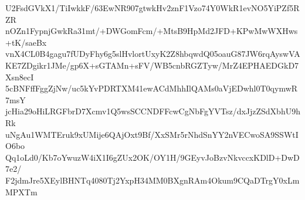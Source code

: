 U2FsdGVkX1/TiIwkkF/63EwNR907gtwkHv2znF1Vzo74Y0WkR1evNO5YiPZf5RZR
nOZn1FypnjGwkRa31mt/+DWGomFcm/+MtsB9HpMd2JFD+KPwMwWXHws+tK/saeBx
vnX4CL0B4gagu7fUDyFhy6g5slHvlortUxyK2Z8hbqwdQ05oauG87JW6rqAyswVA
KE7ZDgikr1JMe/gp6X+sGTAMn+sFV/WB5cnbRGZTyw/MrZ4EPHAEDGkD7Xsn8ecI
5cBNFffFggZjNw/uc5kYvPDRTXM41ewACdMhhIlQAMs0aVjEDwhl0T0qymwR7msY
jcHia29oHiLRGFbrD7Xcmv1Q5wsSCCNDFFcwCgNbFgYVTsz/dxJjzZSdXbhU9hRk
uNgAu1WMTEruk9xUMije6QAjOxt9Bf/XxSMr5rNhdSnYY2nVECwoSA9SSWtIO6bo
Qq1oLd0/Kb7oYwuzW4iX1I6gZUx2OK/OY1H/9GEyvJoBzvNkvccxKDlD+DwD7e2/
F2jdmJre5XEylBHNTq4080Tj2YxpH34MM0BXgnRAm4Okum9CQaDTrgY0xLmMPXTm
